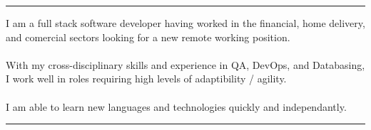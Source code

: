 \documentclass[12pt]{developercv} %
\begin{document}
\vspace{+\baselineskip}
\hrule
\vspace{+\baselineskip}

\begin{minipage}[t]{\textwidth}
{
I am a full stack software developer having worked in the financial, home delivery, and comercial sectors looking for a new remote working position.
}
\\\\
{
With my cross-disciplinary skills and experience in QA, DevOps, and Databasing, I work well in roles requiring high levels of adaptibility / agility.
}	
\\\\
{
I am able to learn new languages and technologies quickly and independantly.
}

\end{minipage}


\vspace{\baselineskip}
\hrule
\vspace{\baselineskip}






\end{document}
